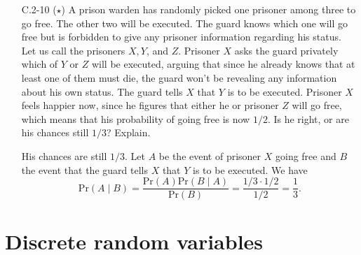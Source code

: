 \begin{enumerate}
\item[C.2{-}10] {($\star$) A prison warden has randomly picked one prisoner
  among three to go free. The other two will be executed. The guard knows which
  one will go free but is forbidden to give any prisoner information regarding
  his status. Let us call the prisoners $X, Y$, and $Z$. Prisoner $X$ asks the
  guard privately which of $Y$ or $Z$ will be executed, arguing that since he
  already knows that at least one of them must die, the guard won't be revealing
  any information about his own status. The guard tells $X$ that $Y$ is to be
  executed.  Prisoner $X$ feels happier now, since he figures that either he or
  prisoner $Z$ will go free, which means that his probability of going free is
  now $1/2$. Is he right, or are his chances still $1/3$? Explain.}
\begin{framed}
  His chances are still $1/3$. Let $A$ be the event of prisoner $X$ going free
  and $B$ the event that the guard tells $X$ that $Y$ is to be executed. We have
  \[
    \text{Pr}(A\;|\;B) = \frac{\text{Pr}(A) \text{Pr}(B\;|\;A)}{\text{Pr}(B)} = \frac{1/3 \cdot 1/2}{1/2} = \frac{1}{3}.
  \]
\end{framed}

\end{enumerate}

\newpage

\section{Discrete random variables}

